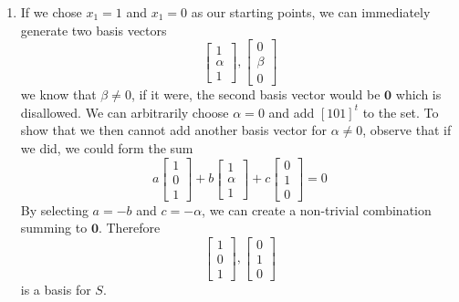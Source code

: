 \documentclass[]{article}
\newcommand{\bbm}{\begin{bmatrix}}		%
\newcommand{\ebm}{\end{bmatrix}}		%
\begin{document}
\begin{enumerate}[resume]
\begin{enumerate}
	  \item If we chose $x_1 = 1$ and $x_1 = 0$ as our starting
        points, we can immediately generate two basis vectors
        \[
        \bbm 1\\\alpha\\1 \ebm, \bbm 0\\\beta\\0 \ebm
        \]
        we know that $\beta \neq 0$, if it were, the second basis
        vector would be $\bm{0}$ which is disallowed. We can
        arbitrarily choose $\alpha = 0$ and add $[1 0 1]^t$ to the
        set. To show that we then cannot add another basis vector for
        $\alpha \neq 0$, observe that if we did, we could form the sum
        \[
        a \bbm 1\\ 0 \\1 \ebm + b \bbm 1\\ \alpha \\1 \ebm + c \bbm 0\\ 1 \\0 \ebm = 0
        \]
        By selecting $a = -b$ and $c = -\alpha$, we can create a
        non-trivial combination summing to $\bm{0}$. Therefore
        \[
        \bbm 1\\ 0 \\1 \ebm, \bbm 0\\ 1 \\0 \ebm
        \]
        is a basis for $S$.


\end{enumerate}
\end{enumerate}
\end{document}
